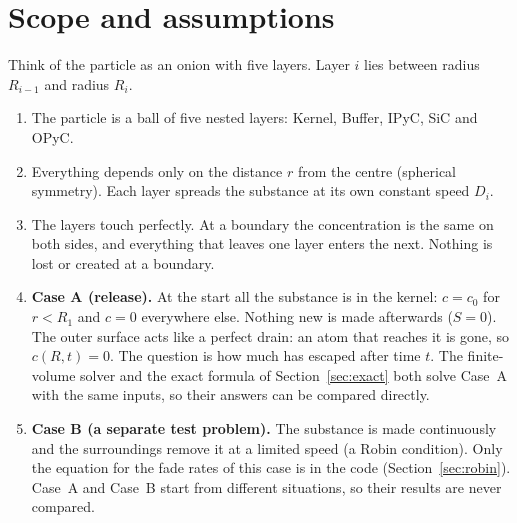 \documentclass[11pt]{article}
\begin{document}
\section{Scope and assumptions}
Think of the particle as an onion with five layers. Layer $i$ lies between radius $R_{i-1}$ and radius $R_i$.
\begin{enumerate}
\item The particle is a ball of five nested layers: Kernel, Buffer, IPyC, SiC and OPyC.
\item Everything depends only on the distance $r$ from the centre (spherical symmetry). Each layer spreads the substance at its own constant speed $D_i$.
\item The layers touch perfectly. At a boundary the concentration is the same on both sides, and everything that leaves one layer enters the next. Nothing is lost or created at a boundary.
\item \textbf{Case A (release).} At the start all the substance is in the kernel: $c=c_0$ for $r<R_1$ and $c=0$ everywhere else. Nothing new is made afterwards ($S=0$). The outer surface acts like a perfect drain: an atom that reaches it is gone, so $c(R,t)=0$. The question is how much has escaped after time $t$. The finite-volume solver and the exact formula of Section~\ref{sec:exact} both solve Case~A with the same inputs, so their answers can be compared directly.
\item \textbf{Case B (a separate test problem).} The substance is made continuously and the surroundings remove it at a limited speed (a Robin condition). Only the equation for the fade rates of this case is in the code (Section~\ref{sec:robin}). Case~A and Case~B start from different situations, so their results are never compared.
\end{enumerate}
\end{document}
